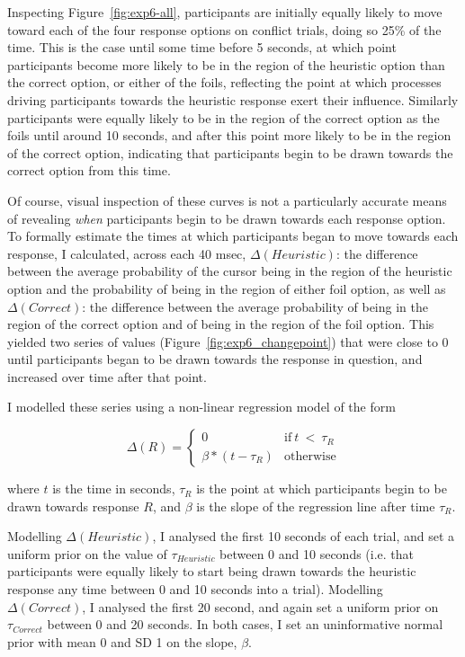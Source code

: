 Inspecting Figure~\ref{fig:exp6-all},
participants are initially equally likely
to move toward each of the four response options
on conflict trials, doing so 25\% of the time.
This is the case until some time before 5 seconds,
at which point participants become more likely
to be in the region of the heuristic option
than the correct option, or either of the foils,
reflecting the point at which processes driving participants
towards the heuristic response exert their influence.
Similarly participants were equally likely to be
in the region of the correct option as the foils
until around 10 seconds,
and after this point more likely to be in the region of the correct option,
indicating that participants begin to be drawn towards the correct option
from this time.

Of course, visual inspection of these curves
is not a particularly accurate means of revealing
\emph{when} participants begin to be drawn towards each response option.
To formally estimate the times at which
participants began to move towards each response,
I calculated, across each 40 msec,
$\Delta (Heuristic)$: the difference between the average probability
of the cursor being in the region of the heuristic option
and the probability of being in the region of either foil option, as well as
$\Delta (Correct)$: the difference between the average probability
of being in the region of the correct option
and of being in the region of the foil option.
This yielded two series of values (Figure~\ref{fig:exp6_changepoint})
that were close to $0$ until participants
began to be drawn towards the response in question,
and increased over time after that point.

I modelled these series using a non-linear regression model
of the form

\begin{equation*}
  \Delta (R) =
  \begin{cases}%
    0          & \text{if}\ t\ <\ \tau_{R} \\
    \beta * (t-\tau_{R})  & \text{otherwise}%
  \end{cases}
\end{equation*}

where $t$ is the time in seconds,
$\tau_{R}$  is the point at which
participants begin to be drawn towards response $R$,
and $\beta$ is the slope of the regression line
after time $\tau_{R}$.

Modelling $\Delta (Heuristic)$, I analysed the first 10 seconds of each trial,
and set a uniform prior on the value of $\tau_{Heuristic}$ between 0 and 10 seconds
(i.e. that participants were equally likely to start being drawn
towards the heuristic response any time between 0 and 10 seconds into a trial).
Modelling $\Delta (Correct)$, I analysed the first 20 second,
and again set a uniform prior on $\tau_{Correct}$ between 0 and 20 seconds.
In both cases, I set an uninformative normal prior
with mean 0 and SD 1 on the slope, $\beta$.

